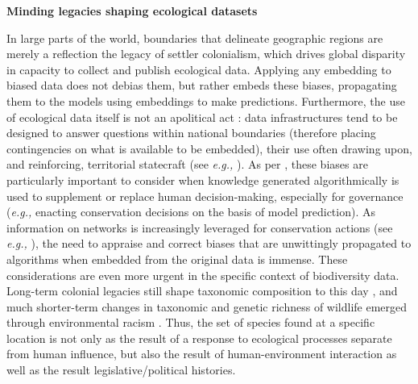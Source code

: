 \begin{summary}\label{box:people}
\textbf{Minding legacies shaping ecological datasets}

In large parts of the world, boundaries that delineate geographic
regions are merely a reflection the legacy of settler colonialism, which
drives global disparity in capacity to collect and publish ecological
data. Applying any embedding to biased data does not debias them, but
rather embeds these biases, propagating them to the models using
embeddings to make predictions. Furthermore, the use of ecological data
itself is not an apolitical act \cite{Nost2021Political}: data
infrastructures tend to be designed to answer questions within national
boundaries (therefore placing contingencies on what is available to be
embedded), their use often drawing upon, and reinforcing, territorial
statecraft (see \emph{e.g.,} \cite{Barrett2005Environment}). As per
\cite{Machen2021Thinking}, these biases are particularly important to consider
when knowledge generated algorithmically is used to supplement or
replace human decision-making, especially for governance (\emph{e.g.,}
enacting conservation decisions on the basis of model prediction). As
information on networks is increasingly leveraged for conservation
actions (see \emph{e.g.,} \cite{Eero2021Use, Naman2022Food,
Stier2017Integrating}), the need to appraise and correct biases that
are unwittingly propagated to algorithms when embedded from the original
data is immense. These considerations are even more urgent in the
specific context of biodiversity data. Long-term colonial legacies still
shape taxonomic composition to this day \cite{Lenzner2022Naturalized,
Raja2022Colonialism}, and much shorter-term changes in taxonomic and
genetic richness of wildlife emerged through environmental racism
\cite{Schmidt2022Systemic}. Thus, the set of species found at a specific
location is not only as the result of a response to ecological processes
separate from human influence, but also the result of human-environment
interaction as well as the result legislative/political histories.
\end{summary}

